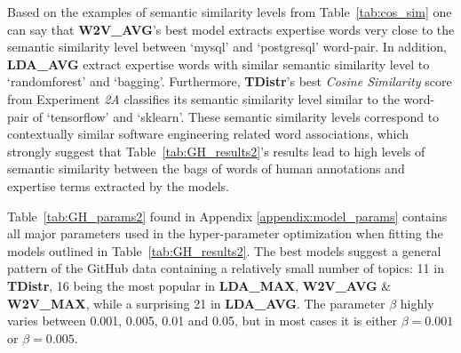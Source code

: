             Based on the examples of semantic similarity levels from Table~\ref{tab:cos_sim} one can say that \textbf{W2V\_AVG}'s best model extracts expertise words very close to the semantic similarity level between `mysql' and `postgresql' word-pair. In addition, \textbf{LDA\_AVG} extract expertise words with similar semantic similarity level to `randomforest' and `bagging'. Furthermore, \textbf{TDistr}'s best \emph{Cosine Similarity} score from Experiment \emph{2A} classifies its semantic similarity level similar to the word-pair of `tensorflow' and `sklearn'. These semantic similarity levels correspond to contextually similar software engineering related word associations, which strongly suggest that Table~\ref{tab:GH_results2}'s results lead to high levels of semantic similarity between the bags of words of human annotations and expertise terms extracted by the models.
             
            Table~\ref{tab:GH_params2} found in Appendix \ref{appendix:model_params} contains all major parameters used in the hyper-parameter optimization when fitting the models outlined in Table~\ref{tab:GH_results2}. The best models suggest a general pattern of the GitHub data containing a relatively small number of topics: 11 in \textbf{TDistr}, 16 being the most popular in \textbf{LDA\_MAX}, \textbf{W2V\_AVG} \& \textbf{W2V\_MAX}, while a surprising 21 in \textbf{LDA\_AVG}. The parameter $\beta$ highly varies between 0.001, 0.005, 0.01 and 0.05, but in most cases it is either $\beta=0.001$ or $\beta=0.005$.
            
